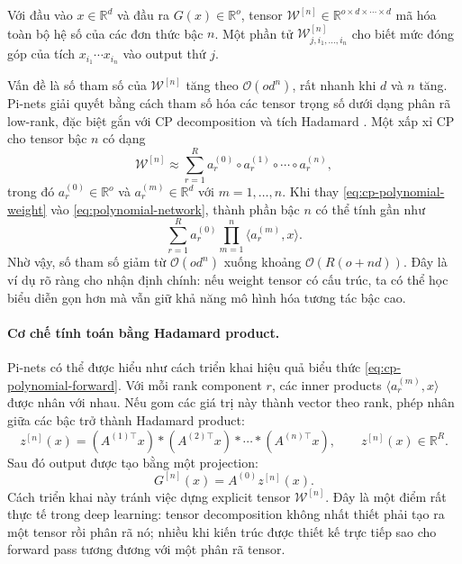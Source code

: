\begin{definition}
Với đầu vào $x \in \mathbb{R}^{d}$ và đầu ra $G(x)\in\mathbb{R}^{o}$, tensor
$\mathcal{W}^{[n]} \in \mathbb{R}^{o \times d \times \cdots \times d}$ mã hóa toàn bộ
hệ số của các đơn thức bậc $n$. Một phần tử
$\mathcal{W}^{[n]}_{j,i_1,\ldots,i_n}$ cho biết mức đóng góp của tích
$x_{i_1}\cdots x_{i_n}$ vào output thứ $j$.
\end{definition}

Vấn đề là số tham số của $\mathcal{W}^{[n]}$ tăng theo $\mathcal{O}(od^n)$, rất nhanh khi $d$ và
$n$ tăng. Pi-nets giải quyết bằng cách tham số hóa các tensor trọng số dưới dạng phân
rã low-rank, đặc biệt gắn với CP decomposition và tích Hadamard
\cite{chrysos2020pi,chrysos2022augmenting}. Một xấp xỉ CP cho tensor bậc $n$ có dạng
\begin{equation}
    \mathcal{W}^{[n]}
    \approx
    \sum_{r=1}^{R}
    a^{(0)}_r \circ a^{(1)}_r \circ \cdots \circ a^{(n)}_r,
    \label{eq:cp-polynomial-weight}
\end{equation}
trong đó $a^{(0)}_r \in \mathbb{R}^{o}$ và
$a^{(m)}_r \in \mathbb{R}^{d}$ với $m=1,\ldots,n$. Khi thay
\eqref{eq:cp-polynomial-weight} vào \eqref{eq:polynomial-network}, thành phần bậc
$n$ có thể tính gần như
\begin{equation}
    \sum_{r=1}^{R}
    a^{(0)}_r
    \prod_{m=1}^{n}
    \langle a^{(m)}_r, x\rangle.
    \label{eq:cp-polynomial-forward}
\end{equation}
Nhờ vậy, số tham số giảm từ $\mathcal{O}(od^n)$ xuống khoảng $\mathcal{O}(R(o+nd))$. Đây là ví dụ rõ ràng
cho nhận định chính: nếu weight tensor có cấu trúc, ta có thể học biểu diễn gọn hơn mà
vẫn giữ khả năng mô hình hóa tương tác bậc cao.

\paragraph{Cơ chế tính toán bằng Hadamard product.}
Pi-nets có thể được hiểu như cách triển khai hiệu quả biểu thức
\eqref{eq:cp-polynomial-forward}. Với mỗi rank component $r$, các inner products
$\langle a^{(m)}_r,x\rangle$ được nhân với nhau. Nếu gom các giá trị này thành vector
theo rank, phép nhân giữa các bậc trở thành Hadamard product:
\begin{equation}
    z^{[n]}(x)
    =
    (A^{(1)\top}x) * (A^{(2)\top}x) * \cdots * (A^{(n)\top}x),
    \qquad z^{[n]}(x)\in\mathbb{R}^{R}.
    \label{eq:pinet-hadamard}
\end{equation}
Sau đó output được tạo bằng một projection:
\begin{equation}
    G^{[n]}(x) = A^{(0)} z^{[n]}(x).
\end{equation}
Cách triển khai này tránh việc dựng explicit tensor $\mathcal{W}^{[n]}$. Đây là một
điểm rất thực tế trong deep learning: tensor decomposition không nhất thiết phải tạo ra
một tensor rồi phân rã nó; nhiều khi kiến trúc được thiết kế trực tiếp sao cho forward
pass tương đương với một phân rã tensor.

